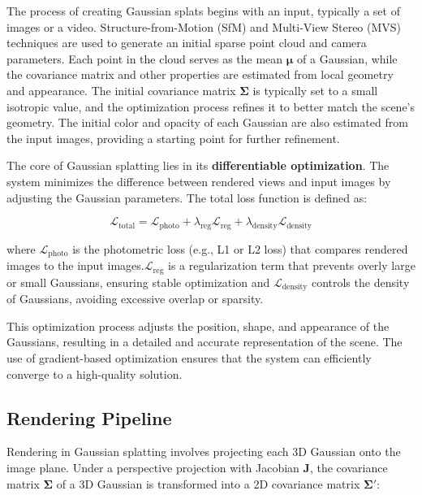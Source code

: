 The process of creating Gaussian splats begins with an input, typically a set of images or a video. Structure-from-Motion (SfM) \citep{Snavely2006} and Multi-View Stereo (MVS) techniques are used to generate an initial sparse point cloud and camera parameters. Each point in the cloud serves as the mean \(\boldsymbol{\mu}\) of a Gaussian, while the covariance matrix and other properties are estimated from local geometry and appearance. The initial covariance matrix \(\boldsymbol{\Sigma}\) is typically set to a small isotropic value, and the optimization process refines it to better match the scene's geometry. The initial color and opacity of each Gaussian are also estimated from the input images, providing a starting point for further refinement.


The core of Gaussian splatting lies in its \textbf{differentiable optimization}. The system minimizes the difference between rendered views and input images by adjusting the Gaussian parameters. The total loss function is defined as:

\[
\mathcal{L}_{\text{total}} = \mathcal{L}_{\text{photo}} + \lambda_{\text{reg}}\mathcal{L}_{\text{reg}} + \lambda_{\text{density}}\mathcal{L}_{\text{density}}
\label{eq:loss}
\]

where \(\mathcal{L}_{\text{photo}}\) is the photometric loss (e.g., L1 or L2 loss) that compares rendered images to the input images.\(\mathcal{L}_{\text{reg}}\) is a regularization term that prevents overly large or small Gaussians, ensuring stable optimization and \(\mathcal{L}_{\text{density}}\) controls the density of Gaussians, avoiding excessive overlap or sparsity.

This optimization process adjusts the position, shape, and appearance of the Gaussians, resulting in a detailed and accurate representation of the scene. The use of gradient-based optimization ensures that the system can efficiently converge to a high-quality solution.







\subsection{Rendering Pipeline}

Rendering in Gaussian splatting involves projecting each 3D Gaussian onto the image plane. Under a perspective projection with Jacobian \(\mathbf{J}\), the covariance matrix \(\boldsymbol{\Sigma}\) of a 3D Gaussian is transformed into a 2D covariance matrix \(\boldsymbol{\Sigma}'\):

